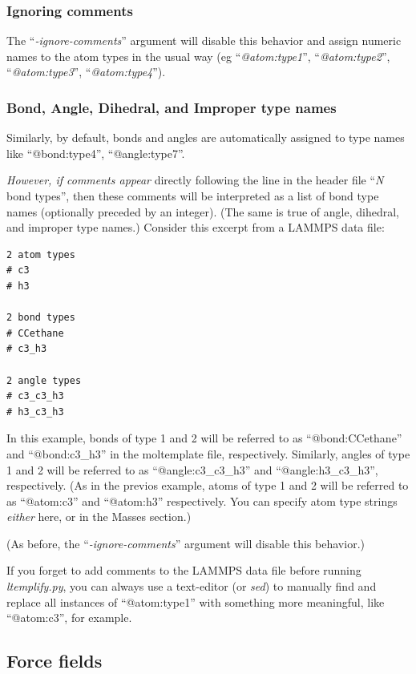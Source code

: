 \documentclass[11pt]{article}
\begin{document}
\subsubsection*{ Ignoring comments}

The ``\textit{-ignore-comments}'' argument will disable this behavior
and assign numeric names to the atom types in the usual way
(eg
``\textit{@atom:type1}'',
``\textit{@atom:type2}'',
``\textit{@atom:type3}'',
``\textit{@atom:type4}'').



\subsubsection*{ Bond, Angle, Dihedral, and Improper type names }

Similarly, by default, bonds and angles are automatically
assigned to type names like ``@bond:type4'',
``@angle:type7''.

\textit{However, if comments appear} directly following the line in the
header file ``\textit{N} bond types'', then these comments will be interpreted
as a list of bond type names (optionally preceded by an integer).
(The same is true of angle, dihedral, and improper type names.)
Consider this excerpt from a LAMMPS data file:
\begin{verbatim}
2 atom types
# c3
# h3

2 bond types
# CCethane
# c3_h3

2 angle types
# c3_c3_h3
# h3_c3_h3
\end{verbatim}

In this example, bonds of type 1 and 2 will be referred to as
``@bond:CCethane'' and ``@bond:c3\_h3''
in the moltemplate file, respectively.
Similarly, angles of type 1 and 2 will be referred to as
``@angle:c3\_c3\_h3'' and ``@angle:h3\_c3\_h3'', respectively.
(As in the previos example, atoms of type 1 and 2 will be referred to as
``@atom:c3'' and ``@atom:h3'' respectively.
You can specify atom type strings \textit{either} here,
or in the Masses section.)

(As before, the ``\textit{-ignore-comments}'' argument will disable this behavior.)

If you forget to add comments to the LAMMPS data file before running
\textit{ltemplify.py}, you can always use a text-editor (or \textit{sed})
to manually find and replace all instances of ``@atom:type1'' with something
more meaningful, like ``@atom:c3'', for example.


\subsection{ Force fields}
\label{sec:ltemplify_force_fields}
\end{document}
